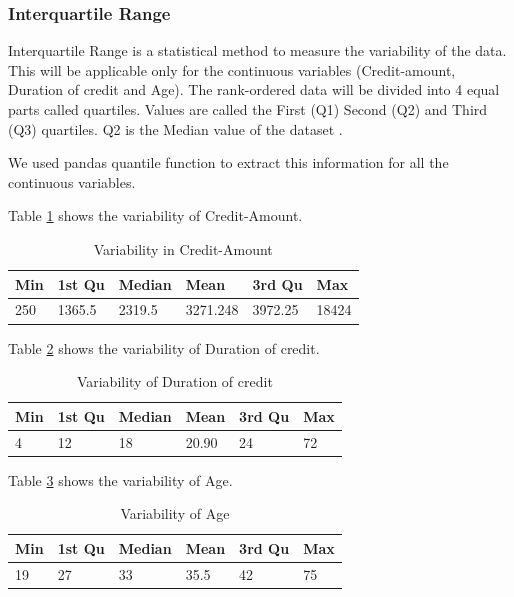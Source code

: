 \documentclass[sigconf]{acmart}
\begin{document}
\subsubsection{Interquartile Range}

Interquartile Range is a statistical method to measure the variability of the data. This will be applicable only for the continuous variables (Credit-amount, Duration of credit and Age). The rank-ordered data will be divided into 4 equal parts called quartiles. Values are called the First (Q1) Second (Q2) and Third (Q3) quartiles. Q2 is the Median value of the dataset \cite{stat-trek-statistics}.

We used pandas quantile function to extract this information for all the continuous variables.

Table \ref{tab:table3} shows the variability of Credit-Amount.



\begin{table}[]
\centering
\caption{Variability in Credit-Amount}
\label{tab:table3}
\begin{tabular}{|l|l|l|l|l|l|}
\hline
\multicolumn{1}{|c|}{Min} & 1st Qu & Median & Mean     & 3rd Qu  & Max   \\ \hline
250                       & 1365.5 & 2319.5 & 3271.248 & 3972.25 & 18424 \\ \hline
\end{tabular}
\end{table}


Table \ref{tab:table4} shows the variability of Duration of credit.


\begin{table}[]
\centering
\caption{Variability of Duration of credit}
\label{tab:table4}
\begin{tabular}{|l|l|l|l|l|l|}
\hline
\multicolumn{1}{|c|}{Min} & 1st Qu & Median & Mean  & 3rd Qu & Max \\ \hline
4                         & 12     & 18     & 20.90 & 24     & 72  \\ \hline
\end{tabular}
\end{table}


Table \ref{tab:table5} shows the variability of Age.


\begin{table}[]
\centering
\caption{Variability of Age}
\label{tab:table5}
\begin{tabular}{|l|l|l|l|l|l|}
\hline
\multicolumn{1}{|c|}{Min} & 1st Qu & Median & Mean & 3rd Qu & Max \\ \hline
19                        & 27     & 33     & 35.5 & 42     & 75  \\ \hline
\end{tabular}
\end{table}
\end{document}
